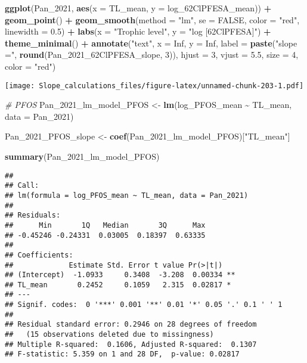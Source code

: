 \documentclass[
]{article}
\newenvironment{Shaded}{\begin{snugshade}}{\end{snugshade}}
\newcommand{\AttributeTok}[1]{\textcolor[rgb]{0.13,0.29,0.53}{#1}}
\newcommand{\CommentTok}[1]{\textcolor[rgb]{0.56,0.35,0.01}{\textit{#1}}}
\newcommand{\ConstantTok}[1]{\textcolor[rgb]{0.56,0.35,0.01}{#1}}
\newcommand{\DecValTok}[1]{\textcolor[rgb]{0.00,0.00,0.81}{#1}}
\newcommand{\FloatTok}[1]{\textcolor[rgb]{0.00,0.00,0.81}{#1}}
\newcommand{\FunctionTok}[1]{\textcolor[rgb]{0.13,0.29,0.53}{\textbf{#1}}}
\newcommand{\NormalTok}[1]{#1}
\newcommand{\OtherTok}[1]{\textcolor[rgb]{0.56,0.35,0.01}{#1}}
\newcommand{\SpecialCharTok}[1]{\textcolor[rgb]{0.81,0.36,0.00}{\textbf{#1}}}
\newcommand{\StringTok}[1]{\textcolor[rgb]{0.31,0.60,0.02}{#1}}
\begin{document}
\begin{Shaded}
\begin{Highlighting}[]
\FunctionTok{ggplot}\NormalTok{(Pan\_2021, }\FunctionTok{aes}\NormalTok{(}\AttributeTok{x =}\NormalTok{ TL\_mean, }\AttributeTok{y =}\NormalTok{ log\_62ClPFESA\_mean)) }\SpecialCharTok{+}
  \FunctionTok{geom\_point}\NormalTok{() }\SpecialCharTok{+}
  \FunctionTok{geom\_smooth}\NormalTok{(}\AttributeTok{method =} \StringTok{"lm"}\NormalTok{, }\AttributeTok{se =} \ConstantTok{FALSE}\NormalTok{, }\AttributeTok{color =} \StringTok{"red"}\NormalTok{, }\AttributeTok{linewidth =} \FloatTok{0.5}\NormalTok{) }\SpecialCharTok{+}
  \FunctionTok{labs}\NormalTok{(}\AttributeTok{x =} \StringTok{"Trophic level"}\NormalTok{,}
       \AttributeTok{y =} \StringTok{"log [62ClPFESA]"}\NormalTok{) }\SpecialCharTok{+}
  \FunctionTok{theme\_minimal}\NormalTok{() }\SpecialCharTok{+}
  \FunctionTok{annotate}\NormalTok{(}\StringTok{"text"}\NormalTok{, }\AttributeTok{x =} \ConstantTok{Inf}\NormalTok{, }\AttributeTok{y =} \ConstantTok{Inf}\NormalTok{, }\AttributeTok{label =} \FunctionTok{paste}\NormalTok{(}\StringTok{"slope ="}\NormalTok{, }\FunctionTok{round}\NormalTok{(Pan\_2021\_62ClPFESA\_slope, }\DecValTok{3}\NormalTok{)), }
           \AttributeTok{hjust =} \DecValTok{3}\NormalTok{, }\AttributeTok{vjust =} \FloatTok{5.5}\NormalTok{, }\AttributeTok{size =} \DecValTok{4}\NormalTok{, }\AttributeTok{color =} \StringTok{"red"}\NormalTok{)}
\end{Highlighting}
\end{Shaded}

\texttt{[image: Slope\_calculations\_files/figure-latex/unnamed-chunk-203-1.pdf]}

\begin{Shaded}
\begin{Highlighting}[]
\CommentTok{\# PFOS}
\NormalTok{Pan\_2021\_lm\_model\_PFOS }\OtherTok{\textless{}{-}} \FunctionTok{lm}\NormalTok{(log\_PFOS\_mean }\SpecialCharTok{\textasciitilde{}}\NormalTok{ TL\_mean,}
                                    \AttributeTok{data =}\NormalTok{ Pan\_2021)}

\NormalTok{Pan\_2021\_PFOS\_slope }\OtherTok{\textless{}{-}} \FunctionTok{coef}\NormalTok{(Pan\_2021\_lm\_model\_PFOS)[}\StringTok{"TL\_mean"}\NormalTok{]}

\FunctionTok{summary}\NormalTok{(Pan\_2021\_lm\_model\_PFOS)}
\end{Highlighting}
\end{Shaded}

\begin{verbatim}
## 
## Call:
## lm(formula = log_PFOS_mean ~ TL_mean, data = Pan_2021)
## 
## Residuals:
##      Min       1Q   Median       3Q      Max 
## -0.45246 -0.24331  0.03005  0.18397  0.63335 
## 
## Coefficients:
##             Estimate Std. Error t value Pr(>|t|)   
## (Intercept)  -1.0933     0.3408  -3.208  0.00334 **
## TL_mean       0.2452     0.1059   2.315  0.02817 * 
## ---
## Signif. codes:  0 '***' 0.001 '**' 0.01 '*' 0.05 '.' 0.1 ' ' 1
## 
## Residual standard error: 0.2946 on 28 degrees of freedom
##   (15 observations deleted due to missingness)
## Multiple R-squared:  0.1606, Adjusted R-squared:  0.1307 
## F-statistic: 5.359 on 1 and 28 DF,  p-value: 0.02817
\end{verbatim}
\end{document}
